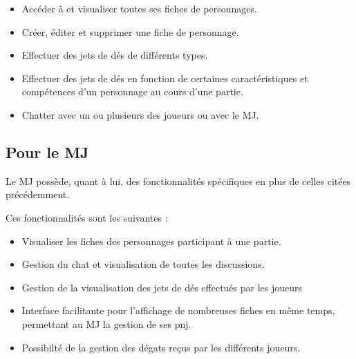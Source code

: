 ﻿\documentclass[11pt,a4paper]{article}
\begin{document}
\begin{itemize}
  \item Accéder à et visualiser toutes ses fiches de personnages.
  \item Créer, éditer et supprimer une fiche de personnage.
  \item Effectuer des jets de dés de différents types.
  \item Effectuer des jets de dés en fonction de certaines caractéristiques et
  compétences d'un personnage au cours d'une partie.
  \item Chatter avec un ou plusieurs des joueurs ou avec le MJ.
\end{itemize}

\subsection{Pour le MJ}
Le MJ possède, quant à lui, des fonctionnalités spécifiques en plus de celles
citées précédemment.

Ces fonctionnalités sont les suivantes :

\begin{itemize}
  \item Visualiser les fiches des personnages participant à une partie.
  \item Gestion du chat et visualisation de toutes les discussions.
\item Gestion de la visualisation des jets de dés effectués par les joueurs
\item Interface facilitante pour l'affichage de nombreuses fiches en même temps,
permettant au MJ la gestion de ses pnj.
\item Possibilté de la gestion des dégats reçus par les différents joueurs.
\end{itemize}

\clearpage
  
\end{document}
